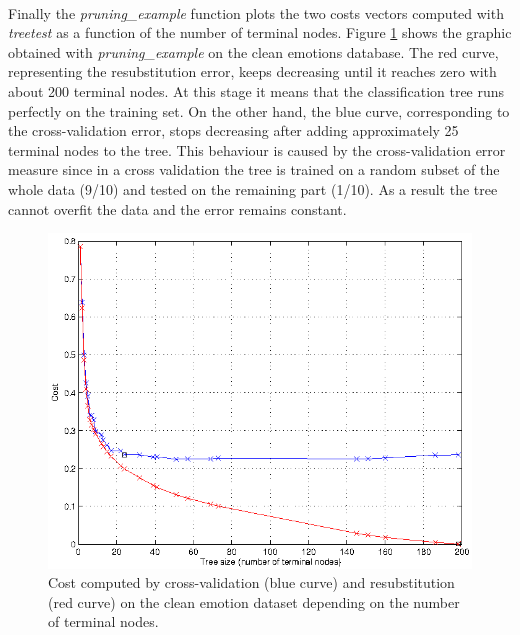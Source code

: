 \documentclass[a4paper,12pt,oneside,final]{report}
\begin{document}
\paragraph{}
Finally the \textit{pruning\_example} function plots the two costs vectors computed with \textit{treetest} as a function of the number of terminal nodes. Figure \ref{fig:pruning} shows the graphic obtained with \textit{pruning\_example} on the clean emotions database. 
The red curve, representing the resubstitution error, keeps decreasing until it reaches zero with about 200 terminal nodes. At this stage it means that the classification tree runs perfectly on the training set. On the other hand, the blue curve, corresponding to the cross-validation error, stops decreasing after adding approximately 25 terminal nodes to the tree. This behaviour is caused by the cross-validation error measure since in a cross validation the tree is trained on a random subset of the whole data (9/10) and tested on the remaining part (1/10). As a result the tree cannot overfit the data and the error remains constant.

\begin{figure}[!h]
\center
\includegraphics{pruning_example_clean.png}
\caption[Pruning example on clean data.]{Cost computed by cross-validation (blue curve) and resubstitution (red curve) on the clean emotion dataset depending on the number of terminal nodes. \label{fig:pruning}}
\end{figure}
\FloatBarrier
\end{document}
